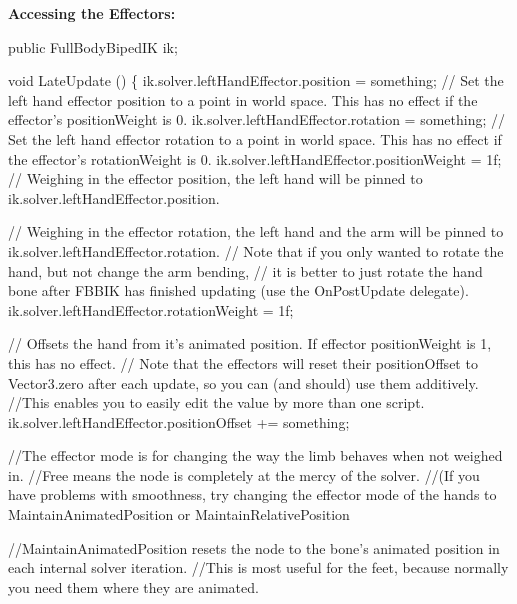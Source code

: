 {\bfseries Accessing the Effectors\+:}


\begin{DoxyCode}
\textcolor{keyword}{public} FullBodyBipedIK ik;

\textcolor{keywordtype}{void} LateUpdate () \{
    ik.solver.leftHandEffector.position = something; \textcolor{comment}{// Set the left hand effector position to a point in
       world space. This has no effect if the effector's positionWeight is 0.}
    ik.solver.leftHandEffector.rotation = something; \textcolor{comment}{// Set the left hand effector rotation to a point in
       world space. This has no effect if the effector's rotationWeight is 0.}
    ik.solver.leftHandEffector.positionWeight = 1f; \textcolor{comment}{// Weighing in the effector position, the left hand
       will be pinned to ik.solver.leftHandEffector.position.}

    \textcolor{comment}{// Weighing in the effector rotation, the left hand and the arm will be pinned to
       ik.solver.leftHandEffector.rotation.}
    \textcolor{comment}{// Note that if you only wanted to rotate the hand, but not change the arm bending, }
    \textcolor{comment}{// it is better to just rotate the hand bone after FBBIK has finished updating (use the OnPostUpdate
       delegate).}
    ik.solver.leftHandEffector.rotationWeight = 1f;

    \textcolor{comment}{// Offsets the hand from it's animated position. If effector positionWeight is 1, this has no effect.}
    \textcolor{comment}{// Note that the effectors will reset their positionOffset to Vector3.zero after each update, so you
       can (and should) use them additively. }
    \textcolor{comment}{//This enables you to easily edit the value by more than one script.}
    ik.solver.leftHandEffector.positionOffset += something; 
    
    \textcolor{comment}{//The effector mode is for changing the way the limb behaves when not weighed in.}
    \textcolor{comment}{//Free means the node is completely at the mercy of the solver. }
    \textcolor{comment}{//(If you have problems with smoothness, try changing the effector mode of the hands to
       MaintainAnimatedPosition or MaintainRelativePosition}

    \textcolor{comment}{//MaintainAnimatedPosition resets the node to the bone's animated position in each internal solver
       iteration. }
    \textcolor{comment}{//This is most useful for the feet, because normally you need them where they are animated.}


\end{DoxyCode}
